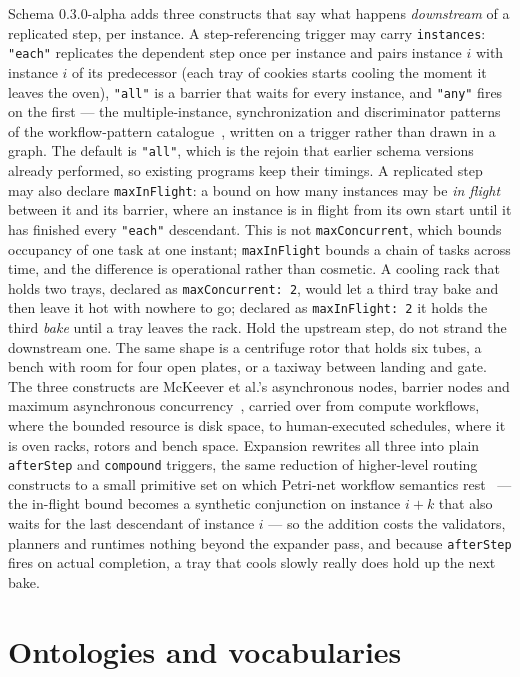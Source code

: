 \documentclass[10pt]{article}
\newcommand{\code}[1]{\texttt{#1}}
\begin{document}
Schema 0.3.0-alpha adds three constructs that say what happens \emph{downstream} of a replicated step, per instance. A step-referencing trigger may carry \code{instances}: \code{"each"} replicates the dependent step once per instance and pairs instance $i$ with instance $i$ of its predecessor (each tray of cookies starts cooling the moment it leaves the oven), \code{"all"} is a barrier that waits for every instance, and \code{"any"} fires on the first --- the multiple-instance, synchronization and discriminator patterns of the workflow-pattern catalogue~\cite{vanderaalst2003patterns}, written on a trigger rather than drawn in a graph. The default is \code{"all"}, which is the rejoin that earlier schema versions already performed, so existing programs keep their timings. A replicated step may also declare \code{maxInFlight}: a bound on how many instances may be \emph{in flight} between it and its barrier, where an instance is in flight from its own start until it has finished every \code{"each"} descendant. This is not \code{maxConcurrent}, which bounds occupancy of one task at one instant; \code{maxInFlight} bounds a chain of tasks across time, and the difference is operational rather than cosmetic. A cooling rack that holds two trays, declared as \code{maxConcurrent: 2}, would let a third tray bake and then leave it hot with nowhere to go; declared as \code{maxInFlight: 2} it holds the third \emph{bake} until a tray leaves the rack. Hold the upstream step, do not strand the downstream one. The same shape is a centrifuge rotor that holds six tubes, a bench with room for four open plates, or a taxiway between landing and gate. The three constructs are McKeever et al.'s asynchronous nodes, barrier nodes and maximum asynchronous concurrency~\cite{mckeever2025scheduler}, carried over from compute workflows, where the bounded resource is disk space, to human-executed schedules, where it is oven racks, rotors and bench space. Expansion rewrites all three into plain \code{afterStep} and \code{compound} triggers, the same reduction of higher-level routing constructs to a small primitive set on which Petri-net workflow semantics rest~\cite{vanderaalst1998petri} --- the in-flight bound becomes a synthetic conjunction on instance $i + k$ that also waits for the last descendant of instance $i$ --- so the addition costs the validators, planners and runtimes nothing beyond the expander pass, and because \code{afterStep} fires on actual completion, a tray that cools slowly really does hold up the next bake.

\section{Ontologies and vocabularies}
\label{sec:ontology}
\end{document}
